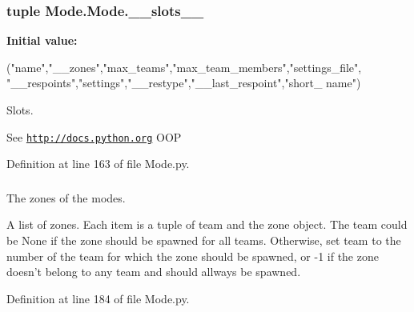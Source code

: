 \hypertarget{class_mode_1_1_mode_a6f65d9a9362971bd8896a81a0d71c642}{
\subsubsection[{\_\-\_\-slots\_\-\_\-}]{\setlength{\rightskip}{0pt plus 5cm}tuple {\bf Mode.Mode.\_\-\_\-slots\_\-\_\-}}}
\label{class_mode_1_1_mode_a6f65d9a9362971bd8896a81a0d71c642}
{\bfseries Initial value:}
\begin{DoxyCode}
("name","__zones","max_teams","max_team_members","settings_file",
                   "__respoints","settings","__restype","__last_respoint","short_
      name")
\end{DoxyCode}


Slots. 

See \href{http://docs.python.org}{\tt http://docs.python.org} OOP 

Definition at line 163 of file Mode.py.

\hypertarget{class_mode_1_1_mode_a0672655c12a3e18e65d084c395d9378c}{
\subsubsection[{\_\-\_\-zones}]{}}
\label{class_mode_1_1_mode_a0672655c12a3e18e65d084c395d9378c}


The zones of the modes. 

A list of zones. Each item is a tuple of team and the zone object. The team could be None if the zone should be spawned for all teams. Otherwise, set team to the number of the team for which the zone should be spawned, or -\/1 if the zone doesn't belong to any team and should allways be spawned. 

Definition at line 184 of file Mode.py.

\hypertarget{class_mode_1_1_mode_a62c4256349100a948a336e4f41e73367}{
\subsubsection[{lives}]{}}
\label{class_mode_1_1_mode_a62c4256349100a948a336e4f41e73367}


